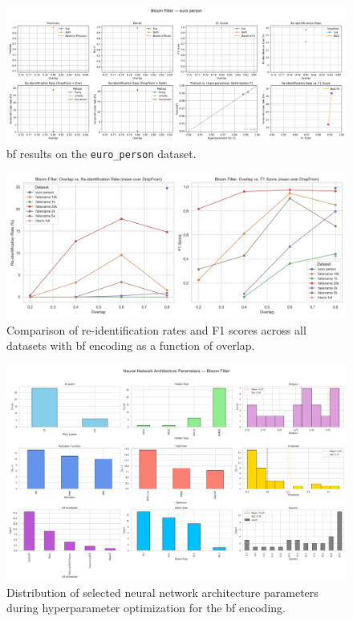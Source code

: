 \begin{figure}[H]
    \centering
    \includegraphics[width=\textwidth]{figures/BloomFilter_euro_person_metrics.png}
    \caption{\ac{bf} results on the \texttt{euro\_person} dataset.}
    \label{fig:bloomfilter_europerson}
\end{figure}

\begin{figure}[H]
    \centering
    \includegraphics[width=\textwidth]{figures/BloomFilter_overlap_summary.png}
    \caption{Comparison of re-identification rates and F1 scores across all datasets with \ac{bf} encoding as a function of overlap.}
    \label{fig:bloomfilter_overlap}
\end{figure}

\begin{figure}[H]
    \centering
    \includegraphics[width=\textwidth]{figures/BloomFilter_architecture.png}
    \caption{Distribution of selected neural network architecture parameters during hyperparameter optimization for the \ac{bf} encoding.}
    \label{fig:bloomfilter_architecture}
\end{figure}

